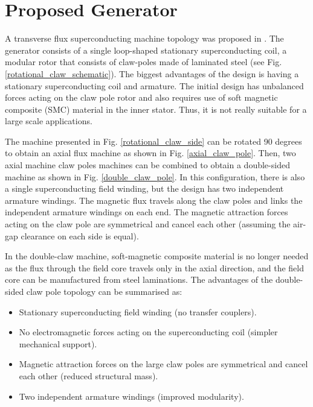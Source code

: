 \documentclass[12pt]{IET02}
\begin{document}
\section{Proposed Generator} %
\label{sec:proposed_generator}

A transverse flux superconducting machine topology was proposed in \cite{Keysan2011e,Keysan2012a}. The generator consists of a single loop-shaped stationary superconducting coil, a modular rotor that consists of claw-poles made of laminated steel (see Fig. \ref{rotational_claw_schematic}). The biggest advantages of the design is having a stationary superconducting coil and armature. The initial design has unbalanced forces acting on the claw pole rotor and also requires use of soft magnetic composite (SMC) material in the inner stator. Thus, it is not really suitable for a large scale applications.

The machine presented in Fig. \ref{rotational_claw_side} can be rotated 90 degrees to obtain an axial flux machine as shown in Fig. \ref{axial_claw_pole}. Then, two axial machine claw poles machines can be combined to obtain a double-sided machine as shown in Fig. \ref{double_claw_pole}. In this configuration, there is also a single superconducting field winding, but the design has two independent armature windings. The magnetic flux travels along the claw poles and links the independent armature windings on each end. The magnetic attraction forces acting on the claw pole are symmetrical and cancel each other (assuming the air-gap clearance on each side is equal). 

In the double-claw machine, soft-magnetic composite material is no longer needed as the flux through the field core travels only in the axial direction, and the field core can be manufactured from steel laminations.
The advantages of the double-sided claw pole topology can be summarised as:

\begin{itemize}
  \item Stationary superconducting field winding (no transfer couplers).
  \item No electromagnetic forces acting on the superconducting coil (simpler mechanical support).
  \item Magnetic attraction forces on the large claw poles are symmetrical and cancel each other (reduced structural mass).
  \item Two independent armature windings (improved modularity).
\end{itemize}
\end{document}
